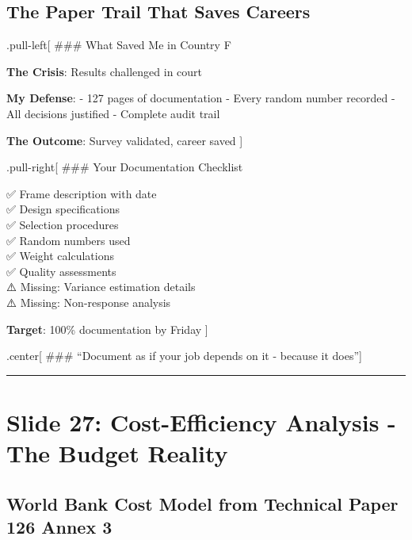 \documentclass[
]{article}
\begin{document}
\subsection{The Paper Trail That Saves
Careers}\label{the-paper-trail-that-saves-careers}

.pull-left{[} \#\#\# What Saved Me in Country F

\textbf{The Crisis}: Results challenged in court

\textbf{My Defense}: - 127 pages of documentation - Every random number
recorded - All decisions justified - Complete audit trail

\textbf{The Outcome}: Survey validated, career saved {]}

.pull-right{[} \#\#\# Your Documentation Checklist

✅ Frame description with date\\
✅ Design specifications\\
✅ Selection procedures\\
✅ Random numbers used\\
✅ Weight calculations\\
✅ Quality assessments\\
⚠️ Missing: Variance estimation details\\
⚠️ Missing: Non-response analysis

\textbf{Target}: 100\% documentation by Friday {]}

.center{[} \#\#\# ``Document as if your job depends on it - because it
does''{]}

\begin{center}\rule{0.5\linewidth}{0.5pt}\end{center}

\section{Slide 27: Cost-Efficiency Analysis - The Budget
Reality}\label{slide-27-cost-efficiency-analysis---the-budget-reality}

\subsection{World Bank Cost Model from Technical Paper 126 Annex
3}\label{world-bank-cost-model-from-technical-paper-126-annex-3}
\end{document}
